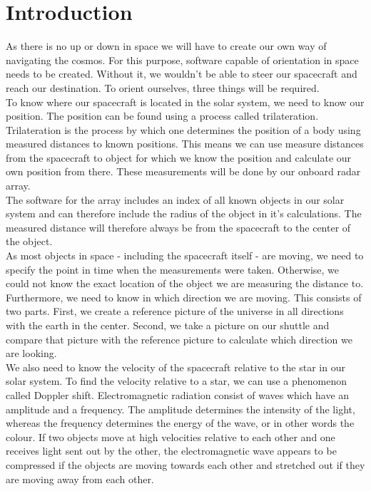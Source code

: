 \documentclass[reprint,english,notitlepage]{revtex4-2}
\begin{document}
\section{Introduction} \label{sec:introduction}
As there is no up or down in space we will have to create our own way of navigating the cosmos.
For this purpose, software capable of orientation in space needs to be created.
Without it, we wouldn't be able to steer our spacecraft and reach our destination.
To orient ourselves, three things will be required.\\
To know where our spacecraft is located in the solar system, we need to know our position.
The position can be found using a process called trilateration.\\
Trilateration is the process by which one determines the position of a body using measured distances to known positions.%
This means we can use measure distances from the spacecraft to object for which we know the position and calculate our own position from there.
These measurements will be done by our onboard radar array.\\
The software for the array includes an index of all known objects in our solar system and can therefore include the radius of the object in it's calculations.
The measured distance will therefore always be from the spacecraft to the center of the object.\\
As most objects in space - including the spacecraft itself - are moving, we need to specify the point in time when the measurements were taken.
Otherwise, we could not know the exact location of the object we are measuring the distance to.\\
Furthermore, we need to know in which direction we are moving.
This consists of two parts.
First, we create a reference picture of the universe in all directions with the earth in the center.
Second, we take a picture on our shuttle and compare that picture with the reference picture to calculate which direction we are looking.\\
We also need to know the velocity of the spacecraft relative to the star in our solar system.
To find the velocity relative to a star, we can use a phenomenon called Doppler shift.
Electromagnetic radiation consist of waves which have an amplitude and a frequency.
The amplitude determines the intensity of the light, whereas the frequency determines the energy of the wave, or in other words the colour.
If two objects move at high velocities relative to each other and one receives light sent out by the other, the electromagnetic wave appears to be compressed if the objects are moving towards each other and stretched out if they are moving away from each other.
\end{document}
